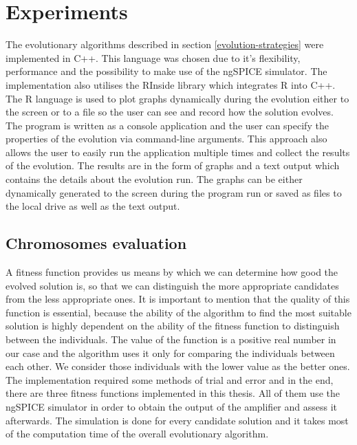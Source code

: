 \chapter{Experiments}
The evolutionary algorithms described in section \ref{evolution-strategies} were implemented in C++. This language was chosen due to it's flexibility, performance and the possibility to make use of the ngSPICE simulator. The implementation also utilises the RInside library which integrates R into C++. The R language is used to plot graphs dynamically during the evolution either to the screen or to a file so the user can see and record how the solution evolves.\\
The program is written as a console application and the user can specify the properties of the evolution via command-line arguments. This approach also allows the user to easily run the application multiple times and collect the results of the evolution. The results are in the form of graphs and a text output which contains the details about the evolution run. The graphs can be either dynamically generated to the screen during the program run or saved as files to the local drive as well as the text output.

\section{Chromosomes evaluation} \label{chromosomes-evaluation}
A fitness function provides us means by which we can determine how good the evolved solution is, so that we can distinguish the more appropriate candidates from the less appropriate ones. It is important to mention that the quality of this function is essential, because the ability of the algorithm to find the most suitable solution is highly dependent on the ability of the fitness function to distinguish between the individuals. The value of the function is a positive real number in our case and the algorithm uses it only for comparing the individuals between each other. We consider those individuals with the lower value as the better ones.\\
The implementation required some methods of trial and error and in the end, there are three fitness functions implemented in this thesis. All of them use the ngSPICE simulator in order to obtain the output of the amplifier and assess it afterwards. The simulation is done for every candidate solution and it takes most of the computation time of the overall evolutionary algorithm.

